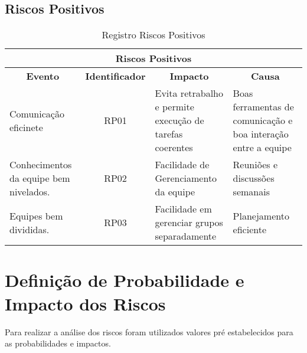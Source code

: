 \subsection{Riscos Positivos}
\begin{table}[h]
  \centering
  \caption{Registro Riscos Positivos}
  \begin{tabular}{|l|c|l|l|}
    \hline
    \multicolumn{4}{|c|}{\textbf{Riscos Positivos}}                                                                                                                                             \\ \hline
    \multicolumn{1}{|c|}{\textbf{Evento}}  & \textbf{Identificador} & \multicolumn{1}{c|}{\textbf{Impacto}}                    & \multicolumn{1}{c|}{\textbf{Causa}}                            \\ \hline
    \parbox[t]{4cm}{Comunicação eficinete}                  & RP01                   & \parbox[t]{4.5cm}{Evita retrabalho e permite execução de tarefas coerentes} & \parbox[t]{4.5cm}{Boas ferramentas de comunicação e boa interação entre a equipe} \\ \hline
    \parbox[t]{4cm}{Conhecimentos da equipe bem nivelados.} & RP02                   & \parbox[t]{4.5cm}{Facilidade de Gerenciamento da equipe}                    & \parbox[t]{4.5cm}{Reuniões e discussões semanais}                                 \\ \hline
    \parbox[t]{4cm}{Equipes bem divididas.}                 & RP03                   & \parbox[t]{4.5cm}{Facilidade em gerenciar grupos separadamente}             & \parbox[t]{4.5cm}{Planejamento eficiente}                                         \\ \hline
  \end{tabular}
\end{table}

\pagebreak

\section{Definição de Probabilidade e Impacto dos Riscos}
Para realizar a análise dos riscos foram utilizados valores pré estabelecidos para as probabilidades e impactos.
